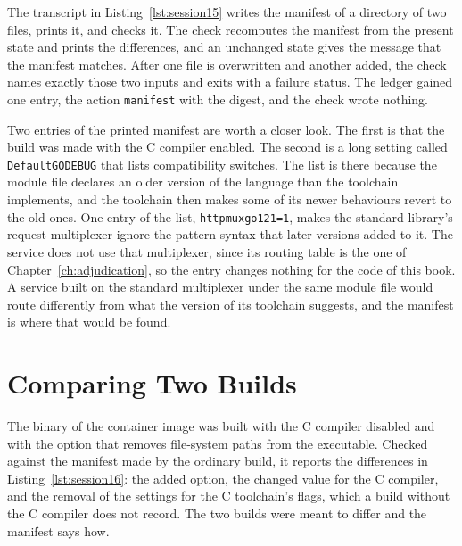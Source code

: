 

The transcript in Listing~\ref{lst:session15} writes the manifest of a directory of two files, prints it, and checks it. The check recomputes the manifest from the present state and prints the differences, and an unchanged state gives the message that the manifest matches. After one file is overwritten and another added, the check names exactly those two inputs and exits with a failure status. The ledger gained one entry, the action \texttt{manifest} with the digest, and the check wrote nothing.

Two entries of the printed manifest are worth a closer look. The first is that the build was made with the C compiler enabled. The second is a long setting called \texttt{DefaultGODEBUG} that lists compatibility switches. The list is there because the module file declares an older version of the language than the toolchain implements, and the toolchain then makes some of its newer behaviours revert to the old ones. One entry of the list, \texttt{httpmuxgo121=1}, makes the standard library's request multiplexer ignore the pattern syntax that later versions added to it. The service does not use that multiplexer, since its routing table is the one of Chapter~\ref{ch:adjudication}, so the entry changes nothing for the code of this book. A service built on the standard multiplexer under the same module file would route differently from what the version of its toolchain suggests, and the manifest is where that would be found.

\section{Comparing Two Builds}



The binary of the container image was built with the C compiler disabled and with the option that removes file-system paths from the executable. Checked against the manifest made by the ordinary build, it reports the differences in Listing~\ref{lst:session16}: the added option, the changed value for the C compiler, and the removal of the settings for the C toolchain's flags, which a build without the C compiler does not record. The two builds were meant to differ and the manifest says how.

